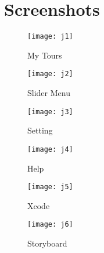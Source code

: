 \documentclass[letterpaper, 10pt,titlepage]{article}
\begin{document}
\newpage
\section{Screenshots}

\begin{figure}[ht]
    \centering
    \texttt{[image: j1]}
    \caption{My Tours}
    \label{jiawei1}
\end{figure}

\begin{figure}[ht]
    \centering
    \texttt{[image: j2]}
    \caption{Slider Menu}
    \label{jiawei2}
\end{figure}

\begin{figure}[ht]
    \centering
    \texttt{[image: j3]}
    \caption{Setting}
    \label{jiawei3}
\end{figure}

\begin{figure}[ht]
    \centering
    \texttt{[image: j4]}
    \caption{Help}
    \label{jiawei4}
\end{figure}

\begin{figure}[ht]
    \centering
    \texttt{[image: j5]}
    \caption{Xcode}
    \label{jiawei5}
\end{figure}

\begin{figure}[ht]
    \centering
    \texttt{[image: j6]}
    \caption{Storyboard}
    \label{jiawei6}
\end{figure}
\end{document}
